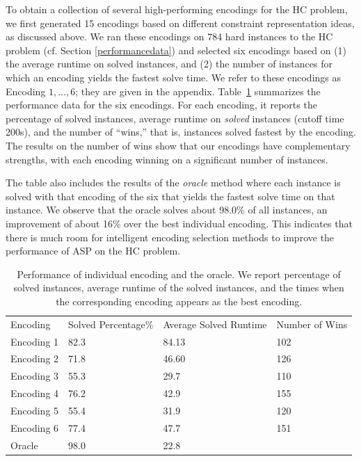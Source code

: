 \documentclass{new_tlp}
\begin{document}
To obtain a collection of several high-performing encodings for the HC 
problem, we first generated 15 encodings based on different constraint 
representation ideas, as discussed above. We ran these encodings on 784 
hard instances to the HC problem (cf. Section \ref{performancedata}) and selected six 
encodings based on (1) the average runtime on solved instances, and (2) 
the number of instances for which an encoding yields the fastest solve 
time. We refer to these encodings as Encoding $1,\ldots, 6$; they are 
given in the appendix. Table~\ref{encperform} summarizes the performance 
data for the six encodings. For each encoding, it
reports the percentage of solved instances, average runtime on \emph{solved} 
instances (cutoff time 200s), and the number of ``wins,'' that is, instances
solved fastest by the encoding. The results on the number of wins show that
our encodings have complementary strengths, with each encoding winning on a
significant number of instances.

The table also includes the results of the \emph{oracle} method where each 
instance is solved with that encoding of the six that yields the fastest 
solve time on that instance. We observe that the oracle solves about 98.0\%
of all instances, an improvement of about 16\% over the best individual 
encoding. This indicates that there is much room for intelligent encoding 
selection methods to improve the performance of ASP on the HC problem.

\begin{table}[]
	\caption{Performance of individual encoding and the oracle. We report percentage of solved instances, average runtime of the solved instances, and the times when the corresponding encoding appears as the best encoding.} \label{encperform}
	\programmath
	\begin{tabular}{llll}
		\hline \hline
		Encoding & Solved Percentage\% & Average Solved Runtime & Number of Wins\\
		Encoding 1     & 82.3             & 84.13              & 102                 \\
		Encoding 2     & 71.8            & 46.60             & 126                 \\
		Encoding 3     & 55.3             & 29.7              & 110                 \\
		Encoding 4     & 76.2             & 42.9              & 155                 \\
		Encoding 5     & 55.4             & 31.9              & 120                 \\
		Encoding 6     & 77.4             & 47.7             & 151                 \\
		Oracle   & 98.0            & 22.8              & \\
		\hline \hline                
	\end{tabular}
	\programmath
\end{table}
\end{document}
